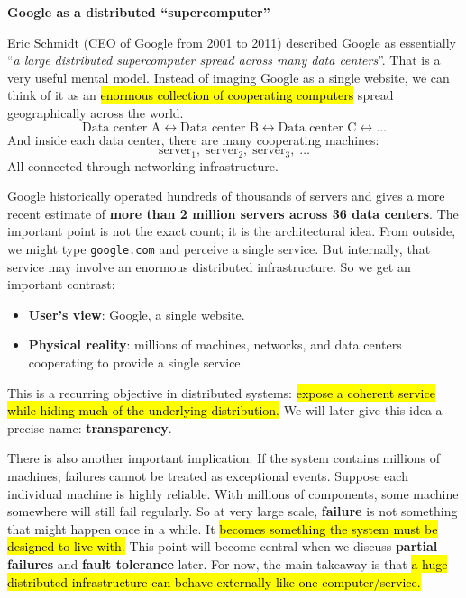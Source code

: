 \highspace
\begin{flushleft}
    \textcolor{Green3}{ \textbf{Google as a distributed ``supercomputer''}}
\end{flushleft}
Eric Schmidt (CEO of Google from 2001 to 2011) described Google as essentially ``\emph{a large distributed supercomputer spread across many data centers}''. That is a very useful mental model. Instead of imaging Google as a single website, we can think of it as an \hl{enormous collection of cooperating computers} spread geographically across the world.
\begin{equation*}
    \text{Data center A} \leftrightarrow \text{Data center B} \leftrightarrow \text{Data center C} \leftrightarrow \dots
\end{equation*}
And inside each data center, there are many cooperating machines:
\begin{equation*}
    \text{server}_{1}, \; \text{server}_{2}, \; \text{server}_{3}, \; \dots
\end{equation*}
All connected through networking infrastructure.

\highspace
Google historically operated hundreds of thousands of servers and gives a more recent estimate of \textbf{more than 2 million servers across 36 data centers}. The important point is not the exact count; it is the architectural idea. From outside, we might type \texttt{google.com} and perceive a single service. But internally, that service may involve an enormous distributed infrastructure. So we get an important contrast:
\begin{itemize}
    \item \textbf{User's view}: Google, a single website.
    \item \textbf{Physical reality}: millions of machines, networks, and data centers cooperating to provide a single service.
\end{itemize}
This is a recurring objective in distributed systems: \hl{expose a coherent service while hiding much of the underlying distribution.} We will later give this idea a precise name: \textbf{transparency}.

\highspace
\textcolor{Red2}{} There is also another important implication. If the system contains millions of machines, failures cannot be treated as exceptional events. Suppose each individual machine is highly reliable. With millions of components, some machine somewhere will still fail regularly. So at very large scale, \textbf{failure} is not something that might happen once in a while. It \hl{becomes something the system must be designed to live with.} This point will become central when we discuss \textbf{partial failures} and \textbf{fault tolerance} later. For now, the main takeaway is that \hl{a huge distributed infrastructure can behave externally like one computer/service.}

